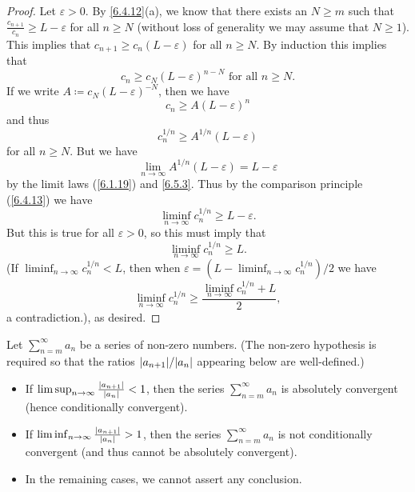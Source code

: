 \begin{proof}
  Let \(\varepsilon > 0\).
  By \cref{6.4.12}(a), we know that there exists an \(N \geq m\) such that \(\frac{c_{n + 1}}{c_n} \geq L - \varepsilon\) for all \(n \geq N\)
  (without loss of generality we may assume that \(N \geq 1\)).
  This implies that \(c_{n + 1} \geq c_n (L - \varepsilon)\) for all \(n \geq N\).
  By induction this implies that
  \[
    c_n \geq c_N (L - \varepsilon)^{n - N} \text{ for all } n \geq N.
  \]
  If we write \(A \coloneqq c_N (L - \varepsilon)^{-N}\), then we have
  \[
    c_n \geq A(L - \varepsilon)^n
  \]
  and thus
  \[
    c_n^{1 / n} \geq A^{1 / n} (L - \varepsilon)
  \]
  for all \(n \geq N\).
  But we have
  \[
    \lim_{n \to \infty} A^{1 / n} (L - \varepsilon) = L - \varepsilon
  \]
  by the limit laws (\cref{6.1.19}) and \cref{6.5.3}.
  Thus by the comparison principle (\cref{6.4.13}) we have
  \[
    \liminf_{n \to \infty} c_n^{1 / n} \geq L - \varepsilon.
  \]
  But this is true for all \(\varepsilon > 0\), so this must imply that
  \[
    \liminf_{n \to \infty} c_n^{1 / n} \geq L.
  \]
  (If \(\liminf_{n \to \infty} c_n^{1 / n} < L\), then when \(\varepsilon = (L - \liminf_{n \to \infty} c_n^{1 / n}) / 2\) we have
  \[
    \liminf_{n \to \infty} c_n^{1 / n} \geq \frac{\liminf_{n \to \infty} c_n^{1 / n} + L}{2},
  \]
  a contradiction.), as desired.
\end{proof}

\begin{cor}\label{7.5.3}
  Let \(\sum_{n = m}^\infty a_n\) be a series of non-zero numbers.
  (The non-zero hypothesis is required so that the ratios \(\abs{a_{n + 1}} / \abs{a_n}\) appearing below are well-defined.)
  \begin{itemize}
    \item If \(\limsup_{n \to \infty} \frac{\left\lvert a_{n + 1}\right\rvert}{\left\lvert a_n\right\rvert} < 1\), then the series \(\sum_{n = m}^\infty a_n\) is absolutely convergent (hence conditionally convergent).
    \item If \(\liminf_{n \to \infty} \frac{\left\lvert a_{n + 1}\right\rvert}{\left\lvert a_n\right\rvert} > 1\), then the series \(\sum_{n = m}^\infty a_n\) is not conditionally convergent (and thus cannot be absolutely convergent).
    \item In the remaining cases, we cannot assert any conclusion.
  \end{itemize}
\end{cor}

